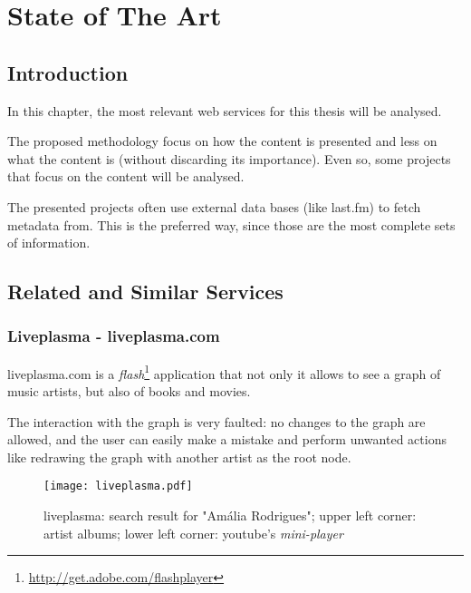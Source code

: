 
\chapter{State of The Art} \label{chap:chap2}

\section*{}


\section{Introduction}

In this chapter, the most relevant web services for this thesis will be analysed.

The proposed methodology focus on how the content is presented and less on what the content is (without discarding its importance).
Even so, some projects that focus on the content will be analysed.

The presented projects often use external data bases (like last.fm) to fetch metadata from.
This is the preferred way, since those are the most complete sets of information. 

\section{Related and Similar Services} %
\label{sec:related_similar_services}

  \subsection{Liveplasma - liveplasma.com} %
  \label{sub:liveplasma}

    liveplasma.com is a \emph{flash}\footnote{\url{http://get.adobe.com/flashplayer}} application that not only it allows to see a graph of music artists, but also of books and movies.

    The interaction with the graph is very faulted: no changes to the graph are allowed, and the user can easily make a mistake and perform unwanted actions like redrawing the graph with another artist as the root node.

    \begin{figure}
      \begin{center}
        \texttt{[image: liveplasma.pdf]}
      \end{center}
      \caption{liveplasma: search result for "Amália Rodrigues"; upper left corner: artist albums; lower left corner: youtube's \emph{mini-player}}
      \label{fig:sota_liveplasma}
    \end{figure}

